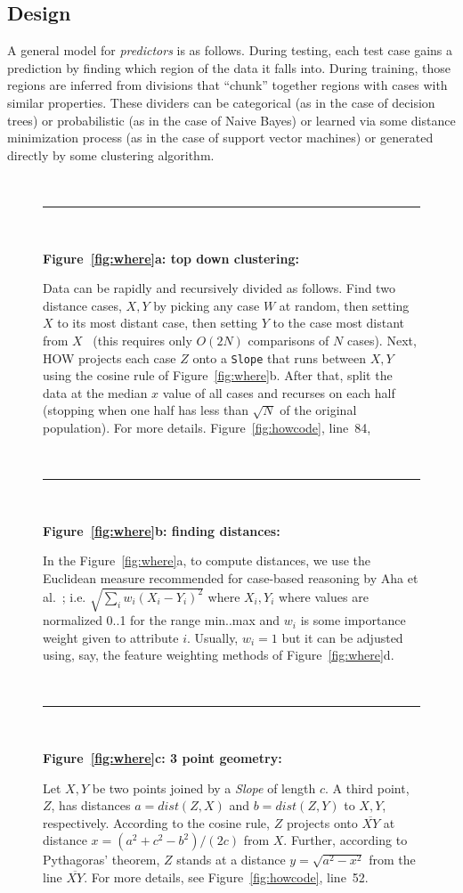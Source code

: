 \documentclass[conference]{IEEEtran}
\newcommand{\fig}[1]{Figure~\ref{fig:#1}}
\begin{document}
\subsection{Design}
A general model for {\em predictors} is as follows. 
During testing, each test case gains a prediction 
by finding which region of the data it falls into.
During training, those regions are inferred from
divisions that ``chunk'' together regions with cases
with similar properties. These dividers can be categorical (as in the case of decision trees) or probabilistic (as in the
case of Naive Bayes) or learned via some distance minimization
process 
(as in the case of support vector machines) or generated
directly by some clustering algorithm. 


\begin{figure}[b!]
\small
~\hrule~

{\bf \fig{where}a: top down clustering:}

Data can be rapidly and recursively divided   as follows.
Find   two   distance cases,  $X,Y$
by picking any case $W$ at random, then setting $X$ to its most
distant case, then setting $Y$ to the case most distant from
$X$~\cite{fastmap}
(this requires only $O(2N)$ comparisons
of $N$ cases).
Next, HOW projects each case $Z$
onto a {\tt Slope} that  runs between $X,Y$ using the cosine
rule of \fig{where}b. After that,  split the data at the median $x$ value of all cases and
recurses on each half  (stopping when
one half has less  than $\sqrt{N}$ of the original population). For more details. \fig{howcode}, line~84, 

~\hrule~
 
{\bf \fig{where}b: finding distances:}

In the \fig{where}a, to compute distances, we use
the Euclidean measure recommended for
case-based reasoning by Aha et al.~\cite{aha91};
i.e. $\sqrt{\sum_iw_i(X_i-Y_i)^2}$ where $X_i,Y_i$
where values are  normalized 0..1 for the range min..max and 
$w_i$ is some importance weight given to attribute $i$.
Usually, $w_i=1$ but it can be adjusted using, say,
the feature weighting methods of \fig{where}d. 
 
 ~\hrule~
 
{\bf \fig{where}c: 3 point geometry:}
 
Let   $X,Y$ be two points joined by  a {\em Slope} of  length $c$.
A third point, $Z$, has distances  $a=dist(Z,X)$ and
$b=dist(Z,Y)$ to $X,Y$, respectively.
According to the cosine rule,   $Z$ projects onto  $\overline{XY}$
at distance $x=(a^2 + c^2 - b^2)/(2c)$ from $X$.
Further, according to Pythagoras' theorem, $Z$ stands at a distance
$y = \sqrt{a^2 - x^2}$ from the line $\overline{XY}$. For more details, see  \fig{howcode}, line~52.


\end{figure}
\end{document}
